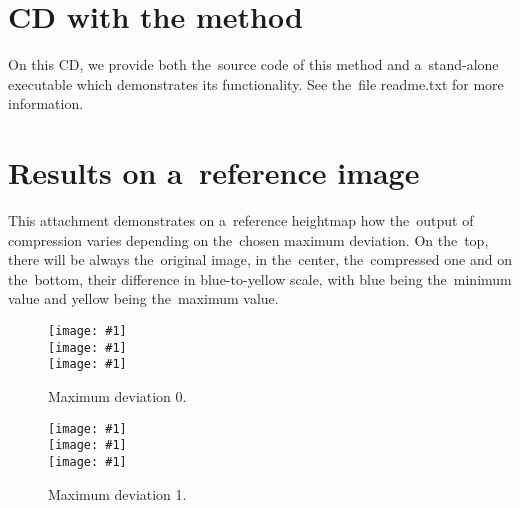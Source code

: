 \appendix

%
%
%
%
%

\openright

\chapter{CD with the method}
\label{att:cd}
On this CD, we provide both the~source code of this method and a~stand-alone executable which demonstrates its functionality. See the~file readme.txt for more information.


\chapter{Results on a~reference image}
\label{att:res_ref}

This attachment demonstrates on a~reference heightmap how the~output of compression varies depending on the~chosen maximum deviation. On the~top, there will be always the~original image, in the~center, the~compressed one and on the~bottom, their difference in blue-to-yellow scale, with blue being the~minimum value and yellow being the~maximum value.

\newcommand{\incref}[1]{\texttt{[image: \#1]}}

\begin{figure}
	\begin{center}
		\incref{figures/out_0.png} \\ 
		\incref{figures/out_0.png} \\ 
		\incref{figures/out_diff_0.png} \\ 
	\end{center}
	\caption{Maximum deviation 0.}
\end{figure}

\begin{figure}
	\begin{center}
		\incref{figures/out_0.png} \\ 
		\incref{figures/out_1.png} \\ 
		\incref{figures/out_diff_1.png} \\ 
	\end{center}
	\caption{Maximum deviation 1.}
\end{figure}

